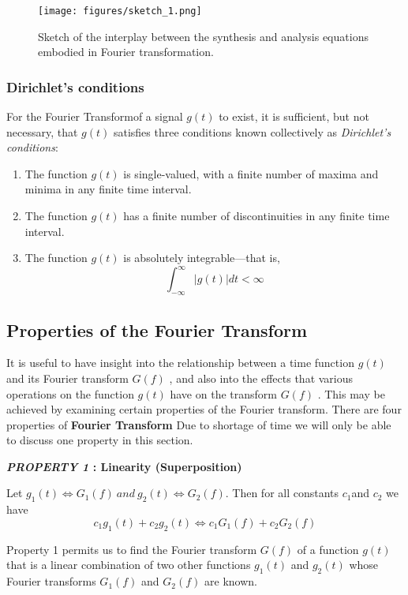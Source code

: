 \documentclass{article}
\newcommand{\FT}{Fourier Transform}
\begin{document}
\begin{figure}[h!]
    \centering
    \texttt{[image: figures/sketch\_1.png]}
    \caption{Sketch of the interplay
between the synthesis and analysis
equations embodied in Fourier
transformation.}
    \label{fig:f1}
\end{figure}

\subsubsection{Dirichlet’s conditions}
For the \FT of a signal $g(t) $ to exist, it is sufficient, but not necessary,
that $g(t)$ satisfies three conditions known collectively as \textit{Dirichlet’s conditions}:
\begin{enumerate}
    \item The function $g(t) $  is single-valued, with a finite number of maxima and minima in any
finite time interval.
    \item The function $g(t)$  has a finite number of discontinuities in any finite time interval.
    \item The function $g(t)$ is absolutely integrable—that is,
    \begin{equation*}
        \int_{-\infty}^{\infty} | g(t) | dt < \infty 
    \end{equation*}

\end{enumerate}

\subsection{Properties of the Fourier Transform}
It is useful to have insight into the relationship between a time function  $g(t)$   and its Fourier
transform  $G(f)$  , and also into the effects that various operations on the function  $g(t)$   have
on the transform  $G(f)$  . This may be achieved by examining certain properties of the Fourier
transform.
There are four properties of \textbf{Fourier Transform}
Due to shortage of time we will only be able to discuss one property in this section.\par
\textbf{\textit{PROPERTY 1} : Linearity (Superposition)}
\par Let $g_1(t) \Longleftrightarrow G_1(f) ~and~ g_2(t) \Longleftrightarrow G_2(f) $. Then for
all constants $ c_1 $and $c_2$ we have $$ c_{1}g_{1}(t) + c_{2}g_{2}(t) \Longleftrightarrow c_{1}G_{1}(f) + c_{2}G_{2}(f) $$ 

Property 1 permits us to find the Fourier transform $G(f)$ of a function  $g(t)$  that is a
linear combination of two other functions  $g_1(t)$  and  $g_2(t)$  whose Fourier transforms  $G_1(f)$ 
and $G_2(f)$ are known.
\end{document}
